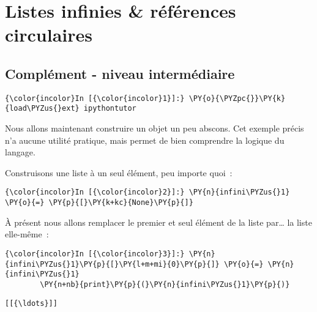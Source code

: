     
    
    
    

    

    \hypertarget{listes-infinies-ruxe9fuxe9rences-circulaires}{%
\section{Listes infinies \& références
circulaires}\label{listes-infinies-ruxe9fuxe9rences-circulaires}}

    \hypertarget{compluxe9ment---niveau-intermuxe9diaire}{%
\subsection{Complément - niveau
intermédiaire}\label{compluxe9ment---niveau-intermuxe9diaire}}

    \begin{Verbatim}[commandchars=\\\{\}]
{\color{incolor}In [{\color{incolor}1}]:} \PY{o}{\PYZpc{}}\PY{k}{load\PYZus{}ext} ipythontutor
\end{Verbatim}


    Nous allons maintenant construire un objet un peu abscons. Cet exemple
précis n'a aucune utilité pratique, mais permet de bien comprendre la
logique du langage.

    Construisons une liste à un seul élément, peu importe quoi~:

    \begin{Verbatim}[commandchars=\\\{\}]
{\color{incolor}In [{\color{incolor}2}]:} \PY{n}{infini\PYZus{}1} \PY{o}{=} \PY{p}{[}\PY{k+kc}{None}\PY{p}{]}
\end{Verbatim}


    À présent nous allons remplacer le premier et seul élément de la liste
par\ldots{} la liste elle-même~:

    \begin{Verbatim}[commandchars=\\\{\}]
{\color{incolor}In [{\color{incolor}3}]:} \PY{n}{infini\PYZus{}1}\PY{p}{[}\PY{l+m+mi}{0}\PY{p}{]} \PY{o}{=} \PY{n}{infini\PYZus{}1}
        \PY{n+nb}{print}\PY{p}{(}\PY{n}{infini\PYZus{}1}\PY{p}{)}
\end{Verbatim}


    \begin{Verbatim}[commandchars=\\\{\}]
[[{\ldots}]]

    \end{Verbatim}

